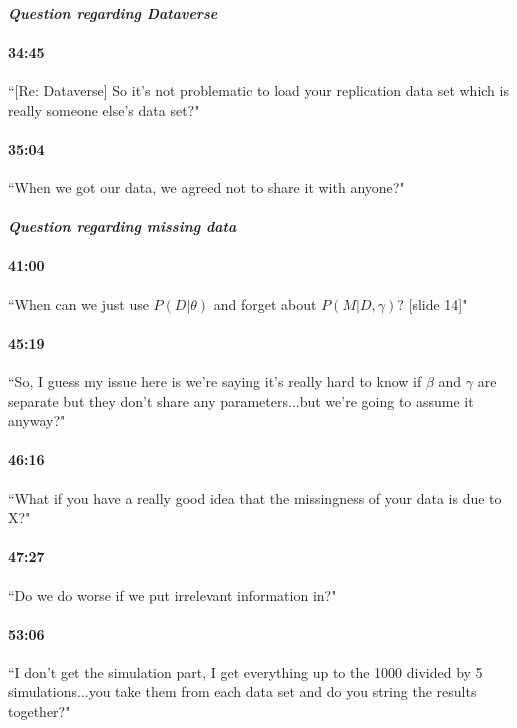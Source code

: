 \documentclass[11pt]{article}
\begin{document}

\paragraph{\emph{Question regarding Dataverse}}

\paragraph{34:45} ``[Re: Dataverse] So it's not problematic to load your replication data set which is really someone else's data set?"

\paragraph{35:04} ``When we got our data, we agreed not to share it with anyone?"


\paragraph{\emph{Question regarding missing data}}

\paragraph{41:00} ``When can we just use $P(D|\theta)$ and forget about $P(M|D,\gamma)$? [slide 14]"

\paragraph{45:19} ``So, I guess my issue here is we're saying it's really hard to know if $\beta$ and $\gamma$ are separate but they don't share any parameters...but we're going to assume it anyway?"

\paragraph{46:16} ``What if you have a really good idea that the missingness of your data is due to X?"

\paragraph{47:27} ``Do we do worse if we put irrelevant information in?"

\paragraph{53:06} ``I don't get the simulation part, I get everything up to the 1000 divided by 5 simulations...you take them from each data set and do you string the results together?"
\end{document}
